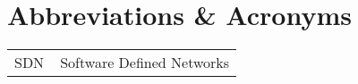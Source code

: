 \chapter*{Abbreviations \& Acronyms}
\begin{flushleft}
\begin{tabular}{l p{0.8\linewidth}}
SDN       & Software Defined Networks\\
\end{tabular}
\end{flushleft}

